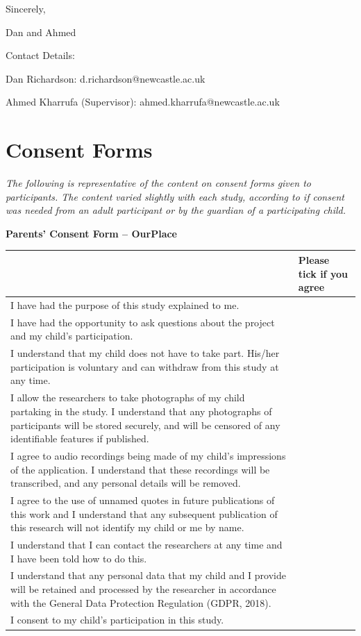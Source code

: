 \vspace{5mm}

Sincerely, 

Dan and Ahmed 

\vspace{5mm}

Contact Details:

Dan Richardson: d.richardson@newcastle.ac.uk 

Ahmed Kharrufa (Supervisor): ahmed.kharrufa@newcastle.ac.uk 

\newpage
\section{Consent Forms}
\label{app:consentForms}

\textit{The following is representative of the content on consent forms given to participants. The content varied slightly with each study, according to if consent was needed from an adult participant or by the guardian of a participating child.}

\vspace{5mm}

\textbf{Parents' Consent Form -- OurPlace}

\vspace{5mm}

{ \RaggedRight
\begin{tabularx}{\linewidth}{ | X | p{30mm} |} 
 \hline
  & Please tick if you agree \\ 
  \hline
 I have had the purpose of this study explained to me. &  \\ 
 \hline
 I have had the opportunity to ask questions about the project and my child’s participation. &  \\ 
 \hline
 I understand that my child does not have to take part. His/her participation is voluntary and can withdraw from this study at any time. & \\
 \hline
 I allow the researchers to take photographs of my child partaking in the study. I understand that any photographs of participants will be stored securely, and will be censored of any identifiable features if published. & \\
 \hline
 I agree to audio recordings being made of my child’s impressions of the application. I understand that these recordings will be transcribed, and any personal details will be removed. & \\
 \hline
 I agree to the use of unnamed quotes in future publications of this work and I understand that any subsequent publication of this research will not identify my child or me by name.   & \\
  \hline
I understand that I can contact the researchers at any time and I have been told how to do this. & \\
  \hline
I understand that any personal data that my child and I provide will be retained and processed by the researcher in accordance with the General Data Protection Regulation (GDPR, 2018). & \\
  \hline
I consent to my child’s participation in this study.  & \\
 \hline
\end{tabularx}
}


